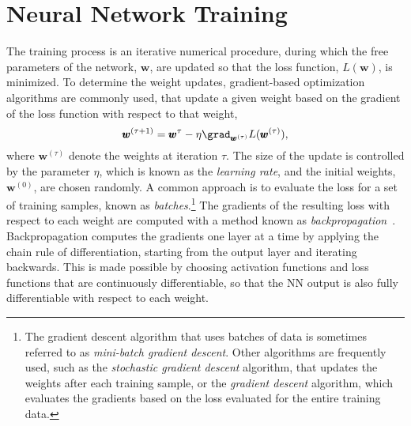 \section{Neural Network Training}
\label{sec:nn-training}


The training process is an iterative numerical procedure, during which the free parameters of the network, $\pmb{w}$, are updated so that the loss function, $L(\pmb{w})$, is minimized. To determine the weight updates, gradient-based optimization algorithms are commonly used, that update a given weight based on the gradient of the loss function with respect to that weight, 
\begin{equation}
    \label{eq:gradient-descent}
    \pmb{w}^{(\tau+1)} = \pmb{w}^\tau - \eta \grad_{\pmb{w}^{(\tau)}} L(\pmb{w}^{(\tau)}),
\end{equation}
where $\pmb{w}^{(\tau)}$ denote the weights at iteration $\tau$.
The size of the update is controlled by the parameter $\eta$, which is known as the \emph{learning rate}, and the initial weights, $\pmb{w}^{(0)}$, are chosen randomly. A common approach is to evaluate the loss for a set of training samples, known as \emph{batches}.\footnote{The gradient descent algorithm that uses batches of data is sometimes referred to as \emph{mini-batch gradient descent}. Other algorithms are frequently used, such as the \emph{stochastic gradient descent} algorithm, that updates the weights after each training sample, or the \emph{gradient descent} algorithm, which evaluates the gradients based on the loss evaluated for the entire training data.} 
The gradients of the resulting loss with respect to each weight are computed with a method known as \emph{backpropagation}~\cite{Rumelhart_1986}. Backpropagation computes the gradients one layer at a time by applying the chain rule of differentiation, starting from the output layer and iterating backwards.
This is made possible by choosing activation functions and loss functions that are continuously differentiable, so that the NN output is also fully differentiable with respect to each weight.

